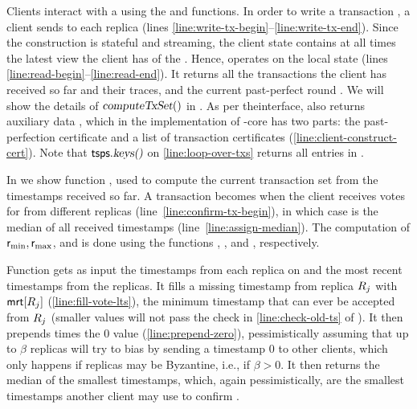 Clients interact with a \podtm using the \opwrite{\tx} and \opreadall{} functions.
In order to write a transaction \tx, a client sends \msgwrite{\tx} to each replica (lines \ref{line:write-tx-begin}--\ref{line:write-tx-end}).
Since the construction is stateful and streaming, the client state contains at all times the latest view the client has of the \podtm. Hence, \opreadall{} operates on the local state (lines \ref{line:read-begin}--\ref{line:read-end}).
It returns all the transactions the client has received so far and their traces, and the current past-perfect round \rperf.
We will show the details of $\textsl{computeTxSet}()$ in .
As per the\podtm interface, \opreadall{} also returns auxiliary data \cert, which in the implementation of \podtm-core has two parts: the past-perfection certificate \ppcert and a list of transaction certificates \txcert (\cref{line:client-construct-cert}).
Note that $\textsf{tsps}.\textsl{keys()}{}$ on \cref{line:loop-over-txs} returns all entries in \tsps.

In  we show function \opComputeTxSet{}, used to compute the current transaction set from the timestamps \tsps received so far.
A transaction becomes \confirmed when the client receives \alpha votes for \tx from different replicas (line~\ref{line:confirm-tx-begin}), in which case \rconf is the median of all received timestamps (line~\ref{line:assign-median}).
The computation of $\textsf{r}_\text{min}, \textsf{r}_\text{max}$, and \rperf is done using the functions \opMinPossibleTs{}, \opMaxPossibleTs{}, and \opMinPossibleTsForNewTx{}, respectively.

Function \opMinPossibleTs{} gets as input the timestamps \txVotesMin from each replica on \tx and the most recent timestamps \mrt from the replicas. It fills a missing timestamp from replica $R_j$ with $\textsf{mrt}[R_j]$ (\cref{line:fill-vote-lts}),
the minimum timestamp that can ever be  accepted from $R_j$ (smaller values will not pass the check in \cref{line:check-old-ts} of ).
It then prepends \beta times the $0$ value (\cref{line:prepend-zero}), pessimistically assuming that up to $\beta$ replicas will try to bias \tx by sending a timestamp $0$ to other clients, which only happens if replicas may be Byzantine, i.e., if $\beta > 0$.
It then returns the median of the \alpha smallest timestamps, which, again pessimistically, are the smallest timestamps another client may use to confirm \tx.


